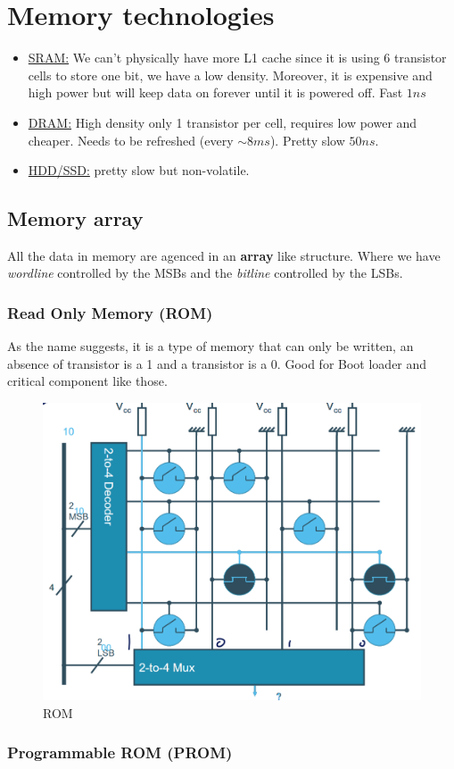 \documentclass{report}
\begin{document}
\section{Memory technologies}

\begin{itemize}
    \item \underline{SRAM:} We can't physically have more L1 cache since it is using 6 transistor cells to store one bit, we have a low density. Moreover, it is expensive and high power but will keep data on forever until it is powered off. Fast $1ns$
    \item \underline{DRAM:} High density only 1 transistor per cell, requires low power and cheaper. Needs to be refreshed (every $\sim 8ms$). Pretty slow $50 ns$.
    \item \underline{HDD/SSD:} pretty slow but non-volatile.
\end{itemize}

\subsection{Memory array}

All the data in memory are agenced in an \textbf{array} like structure. Where we have \textit{wordline} controlled by the MSBs and the \textit{bitline} controlled by the LSBs.

\subsubsection{Read Only Memory (ROM)}

As the name suggests, it is a type of memory that can only be written, an absence of transistor is a 1 and a transistor is a 0. Good for Boot loader and critical component like those.

\begin{figure}[H]
    \centering
    \includegraphics[width=0.4\linewidth]{memory_ROM.png}
    \caption{ROM}
    \label{fig:ROM-label}
\end{figure}

\subsubsection{Programmable ROM (PROM)}
\end{document}

